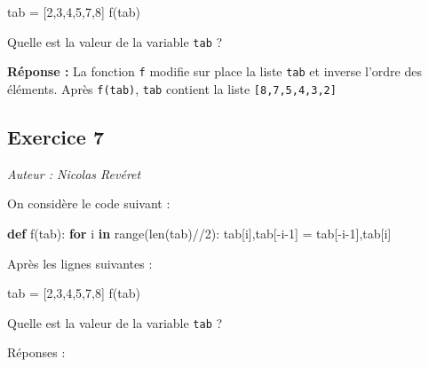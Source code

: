 \documentclass[11pt]{article}
\newenvironment{Shaded}{}{}
\newcommand{\KeywordTok}[1]{\textcolor[rgb]{0.00,0.44,0.13}{\textbf{{#1}}}}
\newcommand{\DecValTok}[1]{\textcolor[rgb]{0.25,0.63,0.44}{{#1}}}
\newcommand{\NormalTok}[1]{{#1}}
\newcommand{\ControlFlowTok}[1]{\textcolor[rgb]{0.00,0.44,0.13}{\textbf{{#1}}}}
\newcommand{\OperatorTok}[1]{\textcolor[rgb]{0.40,0.40,0.40}{{#1}}}
\newcommand{\BuiltInTok}[1]{{#1}}
\begin{document}
\begin{Shaded}
\begin{Highlighting}[]
\NormalTok{tab }\OperatorTok{=}\NormalTok{ [}\DecValTok{2}\NormalTok{,}\DecValTok{3}\NormalTok{,}\DecValTok{4}\NormalTok{,}\DecValTok{5}\NormalTok{,}\DecValTok{7}\NormalTok{,}\DecValTok{8}\NormalTok{]}
\NormalTok{f(tab)}
\end{Highlighting}
\end{Shaded}

Quelle est la valeur de la variable \texttt{tab} ?

    \textbf{Réponse :} La fonction \texttt{f} modifie sur place la liste
\texttt{tab} et inverse l'ordre des éléments. Après \texttt{f(tab)},
\texttt{tab} contient la liste \texttt{{[}8,7,5,4,3,2{]}}

    \hypertarget{exercice-7}{%
\subsection{Exercice 7}\label{exercice-7}}

\emph{Auteur : Nicolas Revéret}

On considère le code suivant :

\begin{Shaded}
\begin{Highlighting}[]
\KeywordTok{def}\NormalTok{ f(tab):}
  \ControlFlowTok{for}\NormalTok{ i }\KeywordTok{in} \BuiltInTok{range}\NormalTok{(}\BuiltInTok{len}\NormalTok{(tab)}\OperatorTok{//}\DecValTok{2}\NormalTok{):}
\NormalTok{    tab[i],tab[}\OperatorTok{{-}}\NormalTok{i}\DecValTok{{-}1}\NormalTok{] }\OperatorTok{=}\NormalTok{ tab[}\OperatorTok{{-}}\NormalTok{i}\DecValTok{{-}1}\NormalTok{],tab[i]}
\end{Highlighting}
\end{Shaded}

Après les lignes suivantes :

\begin{Shaded}
\begin{Highlighting}[]
\NormalTok{tab }\OperatorTok{=}\NormalTok{ [}\DecValTok{2}\NormalTok{,}\DecValTok{3}\NormalTok{,}\DecValTok{4}\NormalTok{,}\DecValTok{5}\NormalTok{,}\DecValTok{7}\NormalTok{,}\DecValTok{8}\NormalTok{]}
\NormalTok{f(tab)}
\end{Highlighting}
\end{Shaded}

Quelle est la valeur de la variable \texttt{tab} ?

Réponses :
\end{document}
